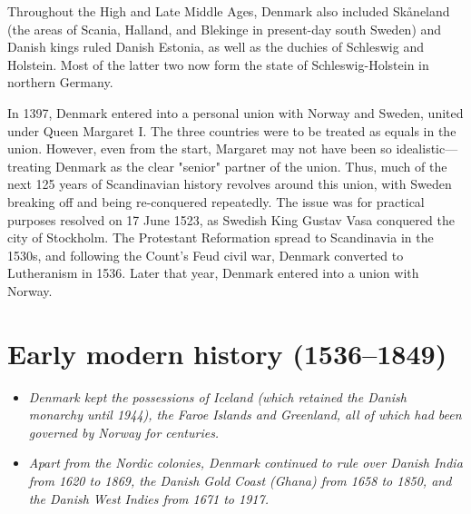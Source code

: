Throughout the High and Late Middle Ages, Denmark also included
Skåneland (the areas of Scania, Halland, and Blekinge in present-day
south Sweden) and Danish kings ruled Danish Estonia, as well as the
duchies of Schleswig and Holstein. Most of the latter two now form the
state of Schleswig-Holstein in northern Germany.

In 1397, Denmark entered into a personal union with Norway and Sweden,
united under Queen Margaret I. The three countries were to be treated as
equals in the union. However, even from the start, Margaret may not have
been so idealistic---treating Denmark as the clear "senior" partner of
the union. Thus, much of the next 125 years of Scandinavian history
revolves around this union, with Sweden breaking off and being
re-conquered repeatedly. The issue was for practical purposes resolved
on 17 June 1523, as Swedish King Gustav Vasa conquered the city of
Stockholm. The Protestant Reformation spread to Scandinavia in the
1530s, and following the Count's Feud civil war, Denmark converted to
Lutheranism in 1536. Later that year, Denmark entered into a union with
Norway.

\section{Early modern history
(1536--1849)}\label{early-modern-history-15361849}

\begin{itemize}
\item
  \emph{Denmark kept the possessions of Iceland (which retained the
  Danish monarchy until 1944), the Faroe Islands and Greenland, all of
  which had been governed by Norway for centuries.}
\item
  \emph{Apart from the Nordic colonies, Denmark continued to rule over
  Danish India from 1620 to 1869, the Danish Gold Coast (Ghana) from
  1658 to 1850, and the Danish West Indies from 1671 to 1917.}
\end{itemize}

